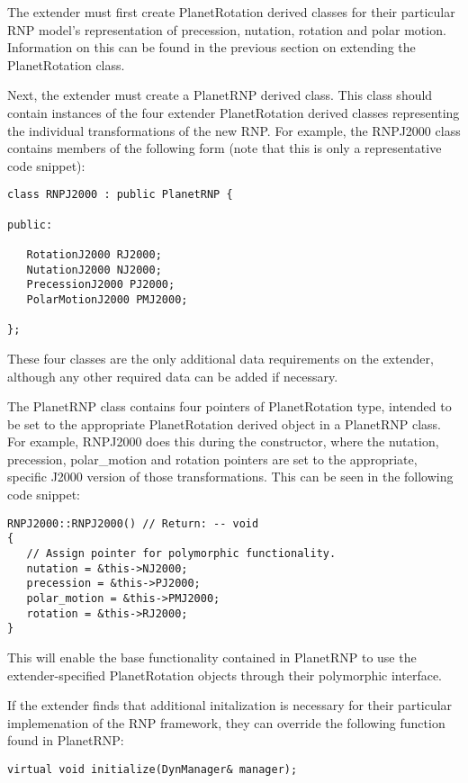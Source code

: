 The extender must first create PlanetRotation derived classes for their
particular RNP model's representation of precession, nutation, rotation and
polar motion. Information on this can be found in the previous section
on extending the PlanetRotation class.

Next, the extender must create a PlanetRNP derived class. This class
should contain instances of the four extender PlanetRotation derived classes
representing the individual transformations of the new RNP. For example,
the RNPJ2000 class contains members of the following form (note that this
is only a representative code snippet):

\begin{verbatim}
class RNPJ2000 : public PlanetRNP {

public:

   RotationJ2000 RJ2000;
   NutationJ2000 NJ2000;
   PrecessionJ2000 PJ2000;
   PolarMotionJ2000 PMJ2000;

};
\end{verbatim}

These four classes are the only additional data requirements on the extender,
although any other required data can be added if necessary.

The PlanetRNP class contains four pointers of PlanetRotation type, intended
to be set to the appropriate PlanetRotation derived object in a
PlanetRNP class. For example, RNPJ2000 does this during the constructor,
where the nutation, precession, polar\_motion and rotation pointers are set
to the appropriate, specific J2000 version of those transformations.
This can be seen in the following code snippet:

\begin{verbatim}
RNPJ2000::RNPJ2000() // Return: -- void
{
   // Assign pointer for polymorphic functionality.
   nutation = &this->NJ2000;
   precession = &this->PJ2000;
   polar_motion = &this->PMJ2000;
   rotation = &this->RJ2000;
}
\end{verbatim}

This will enable the base functionality contained in PlanetRNP to use the
extender-specified PlanetRotation objects through their polymorphic interface.

If the extender finds that additional initalization is necessary for their
particular implemenation of the RNP framework, they can override the following
function found in PlanetRNP:

\begin{verbatim}
virtual void initialize(DynManager& manager);
\end{verbatim}

